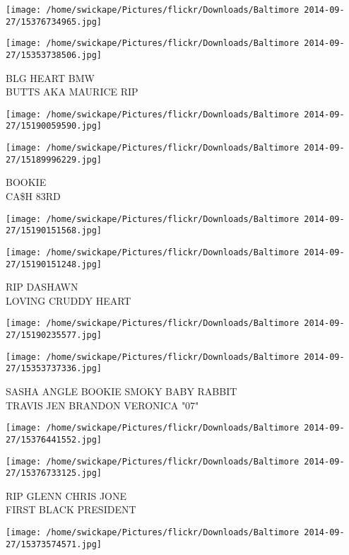 \documentclass[10pt,letterpaper]{article}
\begin{document}
\texttt{[image: /home/swickape/Pictures/flickr/Downloads/Baltimore 2014-09-27/15376734965.jpg]}

\vspace{0.25in}
\texttt{[image: /home/swickape/Pictures/flickr/Downloads/Baltimore 2014-09-27/15353738506.jpg]}

BLG HEART BMW\\
BUTTS AKA MAURICE RIP
\pagebreak

\texttt{[image: /home/swickape/Pictures/flickr/Downloads/Baltimore 2014-09-27/15190059590.jpg]}

\vspace{0.25in}
\texttt{[image: /home/swickape/Pictures/flickr/Downloads/Baltimore 2014-09-27/15189996229.jpg]}

BOOKIE\\
CA\$H 83RD
\pagebreak

\texttt{[image: /home/swickape/Pictures/flickr/Downloads/Baltimore 2014-09-27/15190151568.jpg]}

\vspace{0.25in}
\texttt{[image: /home/swickape/Pictures/flickr/Downloads/Baltimore 2014-09-27/15190151248.jpg]}

RIP DASHAWN\\
LOVING CRUDDY HEART
\pagebreak

\texttt{[image: /home/swickape/Pictures/flickr/Downloads/Baltimore 2014-09-27/15190235577.jpg]}

\vspace{0.25in}
\texttt{[image: /home/swickape/Pictures/flickr/Downloads/Baltimore 2014-09-27/15353737336.jpg]}

SASHA ANGLE BOOKIE SMOKY BABY RABBIT\\
TRAVIS JEN BRANDON VERONICA "07"
\pagebreak

\texttt{[image: /home/swickape/Pictures/flickr/Downloads/Baltimore 2014-09-27/15376441552.jpg]}

\vspace{0.25in}
\texttt{[image: /home/swickape/Pictures/flickr/Downloads/Baltimore 2014-09-27/15376733125.jpg]}

RIP GLENN CHRIS JONE\\
FIRST BLACK PRESIDENT
\pagebreak

\texttt{[image: /home/swickape/Pictures/flickr/Downloads/Baltimore 2014-09-27/15373574571.jpg]}
\end{document}
